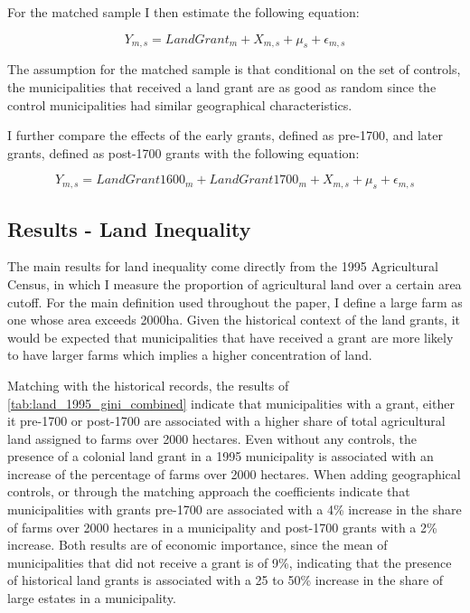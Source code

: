 \documentclass{article}
\begin{document}
For the matched sample I then estimate the following equation:

\begin{equation}
  Y_{m,s} = LandGrant_m + X_{m,s} + \mu_s + \epsilon_{m,s}
\end{equation}

The assumption for the matched sample is that conditional on the set of controls, the municipalities that received a land grant are as good as random since the control municipalities had similar geographical characteristics. 

I further compare the effects of the early grants, defined as pre-1700, and later grants, defined as post-1700 grants with the following equation:

\begin{equation}
  Y_{m,s} = LandGrant1600_m + LandGrant1700_m + X_{m,s} + \mu_s + \epsilon_{m,s}
\end{equation}


\subsection{Results - Land Inequality}

The main results for land inequality come directly from the 1995 Agricultural Census, in which I measure the proportion of agricultural land over a certain area cutoff. 
For the main definition used throughout the paper, I define a large farm as one whose area exceeds 2000ha. 
Given the historical context of the land grants, it would be expected that municipalities that have received a grant are more likely to have larger farms which implies a higher concentration of land. 

Matching with the historical records, the results of \autoref{tab:land_1995_gini_combined} indicate that municipalities with a grant, either it pre-1700 or post-1700 are associated with a higher share of total agricultural land assigned to farms over 2000 hectares. 
Even without any controls, the presence of a colonial land grant in a 1995 municipality is associated with an increase of the percentage of farms over 2000 hectares.
When adding geographical controls, or through the matching approach the coefficients indicate that municipalities with grants pre-1700 are associated with a 4\% increase in the share of farms over 2000 hectares in a municipality and post-1700 grants with a 2\% increase. 
Both results are of economic importance, since the mean of municipalities that did not receive a grant is of 9\%, indicating that the presence of historical land grants is associated with a 25 to 50\% increase in the share of large estates in a municipality. 
\end{document}
